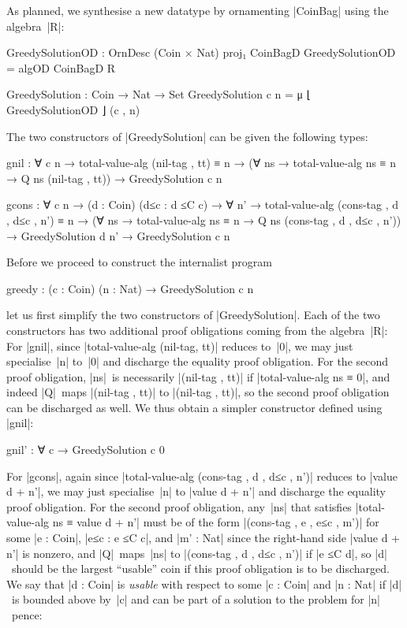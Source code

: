 As planned, we synthesise a new datatype by ornamenting |CoinBag| using the algebra~|R|:
\begin{code}
GreedySolutionOD : OrnDesc (Coin × Nat) proj₁ CoinBagD
GreedySolutionOD = algOD CoinBagD R

GreedySolution : Coin → Nat → Set
GreedySolution c n = μ ⌊ GreedySolutionOD ⌋ (c , n)
\end{code}
The two constructors of |GreedySolution| can be given the following types:
\begin{code}
gnil :  ∀ {c n} →
        total-value-alg (nil-tag , tt) ≡ n →
        (∀ ns → total-value-alg ns ≡ n → Q ns (nil-tag , tt)) →
        GreedySolution c n

gcons :
  ∀ {c n} → (d : Coin) (d≤c : d ≤C c) →
  ∀ {n'} → total-value-alg (cons-tag , d , d≤c , n') ≡ n →
  (∀ ns → total-value-alg ns ≡ n → Q ns (cons-tag , d , d≤c , n')) →
  GreedySolution d n' → GreedySolution c n
\end{code}
Before we proceed to construct the internalist program
\begin{code}
greedy : (c : Coin) (n : Nat) → GreedySolution c n
\end{code}
let us first simplify the two constructors of |GreedySolution|.
Each of the two constructors has two additional proof obligations coming from the algebra~|R|:
For |gnil|, since |total-value-alg (nil-tag, tt)| reduces to~|0|, we may just specialise~|n| to~|0| and discharge the equality proof obligation.
For the second proof obligation,  |ns|~is necessarily |(nil-tag , tt)| if |total-value-alg ns ≡ 0|, and indeed |Q|~maps |(nil-tag , tt)| to |(nil-tag , tt)|, so the second proof obligation can be discharged as well.
We thus obtain a simpler constructor defined using |gnil|:
\begin{code}gnil' : ∀ {c} → GreedySolution c 0
\end{code}For |gcons|, again since |total-value-alg (cons-tag , d , d≤c , n')| reduces to |value d + n'|, we may just specialise~|n| to |value d + n'| and discharge the equality proof obligation.
For the second proof obligation, any~|ns| that satisfies |total-value-alg ns ≡ value d + n'| must be of the form |(cons-tag , e , e≤c , m')| for some |e : Coin|, |e≤c : e ≤C c|, and |m' : Nat| since the right-hand side |value d + n'| is nonzero, and |Q|~maps~|ns| to |(cons-tag , d , d≤c , n')| if |e ≤C d|, so |d|~should be the largest ``usable'' coin if this proof obligation is to be discharged.
We say that |d : Coin| is \emph{usable} with respect to some |c : Coin| and |n : Nat| if |d|~is bounded above by~|c| and can be part of a solution to the problem for |n|~pence:
